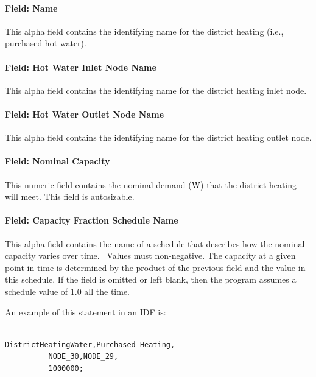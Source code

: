 \paragraph{Field: Name}\label{field-name-16-006}

This alpha field contains the identifying name for the district heating (i.e., purchased hot water).

\paragraph{Field: Hot Water Inlet Node Name}\label{field-hot-water-inlet-node-name-2}

This alpha field contains the identifying name for the district heating inlet node.

\paragraph{Field: Hot Water Outlet Node Name}\label{field-hot-water-outlet-node-name-2}

This alpha field contains the identifying name for the district heating outlet node.

\paragraph{Field: Nominal Capacity}\label{field-nominal-capacity-11}

This numeric field contains the nominal demand (W) that the district heating will meet. This field is autosizable.

\paragraph{Field: Capacity Fraction Schedule Name}\label{field-capacity-fraction-schedule-name-1}

This alpha field contains the name of a schedule that describes how the nominal capacity varies over time.~ Values must non-negative. The capacity at a given point in time is determined by the product of the previous field and the value in this schedule. If the field is omitted or left blank, then the program assumes a schedule value of 1.0 all the time.

An example of this statement in an IDF is:

\begin{lstlisting}

DistrictHeatingWater,Purchased Heating,
          NODE_30,NODE_29,
          1000000;
\end{lstlisting}

